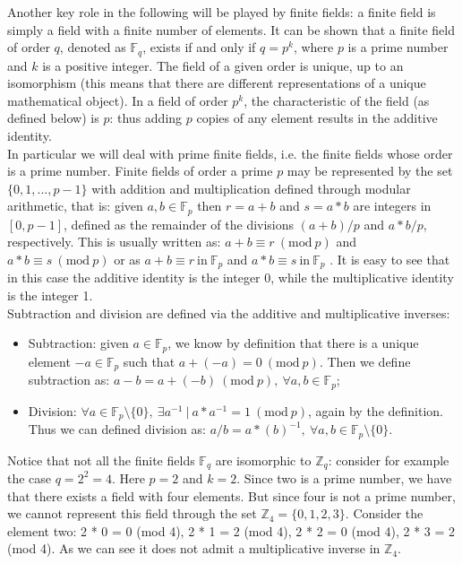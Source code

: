 \bigskip
\noindent
Another key role in the following will be played by finite fields: a finite field is simply a field with a finite number of elements. It can be shown that a finite field of order $q$, denoted as $\mathbb{F}_q$, exists if and only if $q = p^k$, where $p$ is a prime number and $k$ is a positive integer. The field of a given order is unique, up to an isomorphism (this means that there are different representations of a unique mathematical object). In a field of order $p^k$, the characteristic of the field (as defined below) is $p$: thus adding $p$ copies of any element results in the additive identity. 
\\
In particular we will deal with prime finite fields, i.e. the finite fields whose order is a prime number. Finite fields of order a prime $p$ may be represented by the set $\{0, 1, ..., p-1\}$ with addition and multiplication defined through modular arithmetic, that is: given $a, b \in \mathbb{F}_p$ then $r = a + b$ and $s = a * b$ are integers in $[0, p - 1]$, defined as the remainder of the divisions $(a + b)/p$ and $a*b/p$, respectively. This is usually written as: $a + b \equiv r \ (\text{mod} \ p)$ and $a * b \equiv s \ (\text{mod} \ p)$ or as $a + b \equiv r \ \text{in} \ \mathbb{F}_p$ and $a * b \equiv s \ \text{in} \ \mathbb{F}_p$ . It is easy to see that in this case the additive identity is the integer 0, while the multiplicative identity is the integer 1.
\\
Subtraction and division are defined via the additive and multiplicative inverses:
\begin{itemize}
	\item Subtraction: given $a \in \mathbb{F}_p$, we know by definition that there is a unique element $-a \in \mathbb{F}_p$ such that $a + (-a) = 0 \ (\text{mod} \ p)$. Then we define subtraction as: $a - b = a + (-b) \ (\text{mod} \ p), \ \forall a, b \in \mathbb{F}_p$;
	\item Division: $\forall a \in \mathbb{F}_p \text{\textbackslash} \{0\}, \ \exists a^{-1} \ | \ a * a^{-1} = 1 \ (\text{mod} \ p)$, again by the definition. Thus we can defined division as: $a / b = a * (b)^{-1}, \ \forall a, b \in \mathbb{F}_p \text{\textbackslash} \{0\}$.
\end{itemize}
Notice that not all the finite fields $\mathbb{F}_q$ are isomorphic to $\mathbb{Z}_q$: consider for example the case $q = 2^2 = 4$. Here $p = 2$ and $k = 2$. Since two is a prime number, we have that there exists a field with four elements. But since four is not a prime number, we cannot represent this field through the set $\mathbb{Z}_4 = \{0, 1, 2, 3\}$. Consider the element two: 2 * 0 = 0 (mod 4), 2 * 1 = 2 (mod 4), 2 * 2 = 0 (mod 4), 2 * 3 = 2 (mod 4). As we can see it does not admit a multiplicative inverse in $\mathbb{Z}_4$. 

